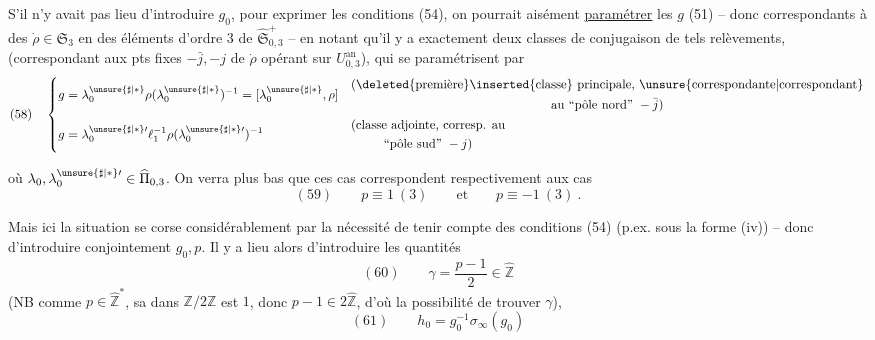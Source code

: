 S'il n'y avait pas lieu d'introduire $g_0$, pour exprimer les conditions (54), on pourrait aisément \uline{paramétrer} les $g$  (51) -- donc correspondants à des  $\dot\rho\in\mathfrak S_3$ en des éléments d'ordre $3$ de $\widehat{\mathfrak S}_{0,3}^{+}$ -- en notant qu'il y a exactement deux classes de conjugaison de tels relèvements, (correspondant aux pts fixes $-\bar j,-j$ de $\dot\rho$ opérant sur $U_{0,3}^{\mathrm{an}}$), qui se paramétrisent par
\[
(58)\quad
\left\{\begin{aligned}
g&=\lambda_0^{\unsure{\sharp|\ast}}\rho(\lambda_0^{\unsure{\sharp|\ast}})^{-1}
=[\lambda_0^{\unsure{\sharp|\ast}},\rho]
&&\begin{gathered}\text{(\deleted{première}\inserted{classe} principale, \unsure{correspondante|correspondant}}\\
\text{au ``pôle nord'' }-\bar j)\end{gathered}\\
g&=\lambda_0^{\unsure{\sharp|\ast}\prime}\ell_1^{-1}\rho(\lambda_0^{\unsure{\sharp|\ast}\prime})^{-1}
&&\begin{gathered}\text{(classe adjointe, corresp. au}\\
\text{``pôle sud'' }-j)\end{gathered}
\end{aligned}\right.
\]


où $\lambda_0,\lambda_0^{\unsure{\sharp|\ast}\prime}\in\widehat{\Pi}_{0,3}$. On verra plus bas que ces cas correspondent respectivement aux cas
\[
(59)\qquad p\equiv1\ (3)\qquad\text{et}\qquad p\equiv-1\ (3)\ .
\]


Mais ici la situation se corse considérablement par la nécessité de tenir compte des  conditions (54) (p.ex. sous la forme (iv)) -- donc  d'introduire conjointement $g_0,p$. Il y a lieu alors d'introduire les quantités
\[
(60)\qquad \gamma=\frac{p-1}{2}\in\widehat{\mathbb Z}
\]
(NB comme $p\in\widehat{\mathbb Z}^{\ast}$, sa  dans $\mathbb Z/2\mathbb Z$ est $1$, donc $p-1\in2\widehat{\mathbb Z}$, d'où la possibilité de trouver $\gamma$),
\[
(61)\qquad h_0=g_0^{-1}\sigma_\infty(g_0)
\]


